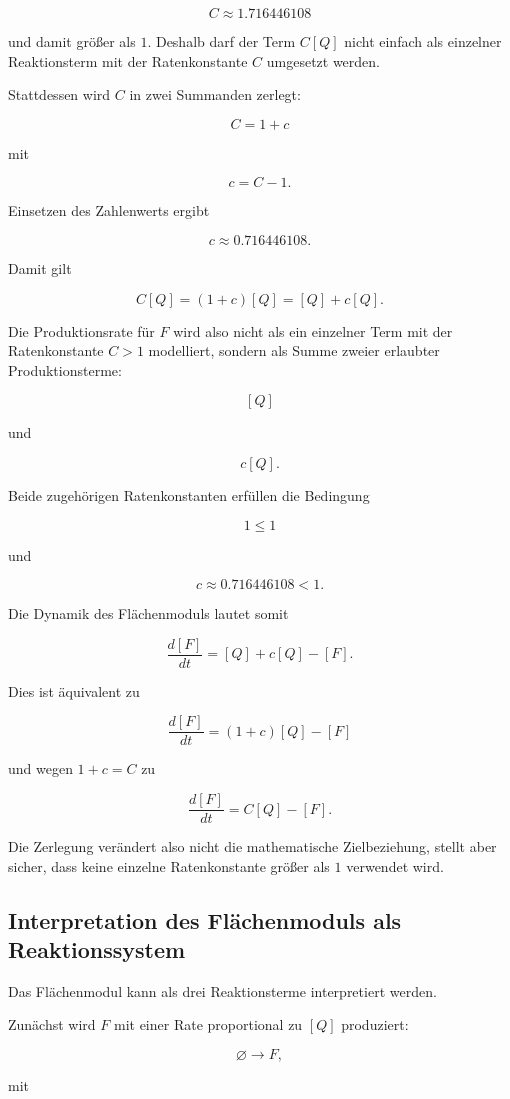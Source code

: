 \[
C\approx1.716446108
\]

und damit größer als \(1\). Deshalb darf der Term \(C[Q]\) nicht einfach
als einzelner Reaktionsterm mit der Ratenkonstante \(C\) umgesetzt werden.

Stattdessen wird \(C\) in zwei Summanden zerlegt:

\[
C=1+c
\]

mit

\[
c=C-1.
\]

Einsetzen des Zahlenwerts ergibt

\[
c\approx0.716446108.
\]

Damit gilt

\[
C[Q]
=
(1+c)[Q]
=
[Q]+c[Q].
\]

Die Produktionsrate für \(F\) wird also nicht als ein einzelner Term mit
der Ratenkonstante \(C>1\) modelliert, sondern als Summe zweier erlaubter
Produktionsterme:

\[
[Q]
\]

und

\[
c[Q].
\]

Beide zugehörigen Ratenkonstanten erfüllen die Bedingung

\[
1\leq 1
\]

und

\[
c\approx0.716446108<1.
\]

Die Dynamik des Flächenmoduls lautet somit

\[
\frac{d[F]}{dt}
=
[Q]+c[Q]-[F].
\]

Dies ist äquivalent zu

\[
\frac{d[F]}{dt}
=
(1+c)[Q]-[F]
\]

und wegen \(1+c=C\) zu

\[
\frac{d[F]}{dt}
=
C[Q]-[F].
\]

Die Zerlegung verändert also nicht die mathematische Zielbeziehung,
stellt aber sicher, dass keine einzelne Ratenkonstante größer als \(1\)
verwendet wird.

\subsection{Interpretation des Flächenmoduls als Reaktionssystem}

Das Flächenmodul kann als drei Reaktionsterme interpretiert werden.

Zunächst wird \(F\) mit einer Rate proportional zu \([Q]\) produziert:

\[
\varnothing \longrightarrow F,
\]

mit

